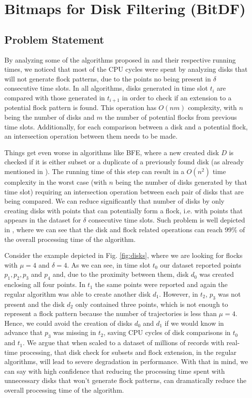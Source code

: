 \chapter{\textbf{Bit}maps for \textbf{D}isk \textbf{F}iltering (BitDF)}
\label{chp:algorithm}
\section{Problem Statement}
By analyzing some of the algorithms proposed in  and their respective running times, we noticed
that most of the CPU cycles were spent by analyzing disks that will not generate flock patterns, due to the points no
being present in $\delta$ consecutive time slots. In all algorithms, disks generated in time slot $t_i$ are compared
with those generated in $t_{i+1}$ in order to check if an extension to a potential flock pattern is found. This
operation has $O(nm)$ complexity, with $n$ being the number of disks and $m$ the number of potential flocks from
previous time slots.  Additionally, for each comparison between a disk and a potential flock, an intersection operation
between them needs to be made.

Things get even worse in algorithms like BFE, where a new created disk $D$ is checked if it is either subset or a
duplicate of a previously found disk (as already mentioned in ). The running time of this
step can result in a $O(n^2)$ time complexity in the worst case (with $n$ being the number of disks generated by that
time slot) requiring an intersection operation between each pair of disks that are being compared. We can reduce
significantly that number of disks by only creating disks with points that can potentially form a flock, i.e. with
points that appears in the dataset for $\delta$ consecutive time slots. Such problem is well depicted in
, where we can see that the disk and flock related operations can reach 99\% of the overall
processing time of the algorithm.

Consider the example depicted in Fig. \ref{fig:disks}, where we are looking for flocks with $\mu=4$ and $\delta=4$. As
we can see, in time slot $t_0$ our dataset reported points $p_1,p_2,p_3$ and $p_4$ and, due to the proximity between
them, disk $d_0$ was created enclosing all four points. In $t_1$ the same points were reported and again the regular
algorithm was able to create another disk $d_1$. However, in $t_2$, $p_3$ was not present and the disk $d_2$ only
contained three points, which is not enough to represent a flock pattern because the number of trajectories is less than
$\mu = 4$. Hence, we could avoid the creation of disks $d_0$ and $d_1$ if we would know in advance that $p_3$ was
missing in $t_2$, saving CPU cycles of disk comparisons in $t_0$ and $t_1$. We argue that when scaled to a dataset of
millions of records with real-time processing, that disk check for subsets and flock extension, in the regular
algorithms, will lead to severe degradation in performance. With that in mind, we can say with high confidence that
reducing the processing time spent with unnecessary disks that won't generate flock patterns, can dramatically reduce
the overall processing time of the algorithm.

